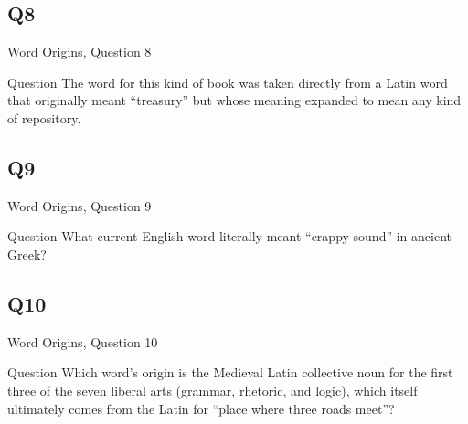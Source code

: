 \documentclass[11pt]{beamer}
\begin{document}
\subsection*{Q8}
\begin{frame}[t]{Word Origins, Question 8}
\begin{block}{Question}
The word for this kind of book was taken directly from a Latin word that originally meant ``treasury'' but whose meaning expanded to mean any kind of repository.
\end{block}
\end{frame}
\subsection*{Q9}
\begin{frame}[t]{Word Origins, Question 9}
\begin{block}{Question}
What current English word literally meant ``crappy sound'' in ancient Greek?
\end{block}
\end{frame}
\subsection*{Q10}
\begin{frame}[t]{Word Origins, Question 10}
\begin{block}{Question}
Which word's origin is the Medieval Latin collective noun for the first three of the seven liberal arts (grammar, rhetoric, and logic), which itself ultimately comes from the Latin for ``place where three roads meet''?
\end{block}
\end{frame}
\end{document}
